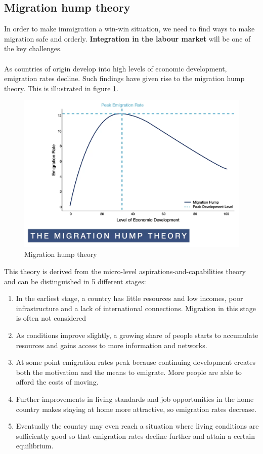 \documentclass[../summary.tex]{subfiles}
\begin{document}
 	\subsection{Migration hump theory}
 	In order to make immigration a win-win situation, we need to find ways to make migration safe and orderly. \textbf{Integration in the labour market} will be one of the key challenges.
 	\\
 	\\
 	As countries of origin develop into high levels of economic development, emigration rates decline. Such findings have given rise to the migration hump theory. This is illustrated in figure \ref{fig:7-hump}.
 	\begin{figure}[h]
 		\centering
 		\includegraphics[width=0.7\linewidth]{../images/7-hump}
 		\caption{Migration hump theory}
 		\label{fig:7-hump}
 	\end{figure}
 	This theory is derived from the micro-level aspirations-and-capabilities theory and can be distinguished in 5 different stages:
 	\begin{enumerate}
 		\item In the earliest stage, a country has little resources and low incomes, poor infrastructure and a lack of international connections. Migration in this stage is often not considered
		\item As conditions improve slightly, a growing share of people starts to accumulate resources and gains access to more information and networks.
		\item At some point emigration rates peak because continuing development creates both the motivation and the means to emigrate. More people are able to afford the costs of moving.
		\item Further improvements in living standards and job opportunities in the home country makes staying at home more attractive, so emigration rates decrease.
		\item Eventually the country may even reach a situation where living conditions are sufficiently good so that emigration rates decline further and attain a certain equilibrium.
 	\end{enumerate}
 	
\end{document}
